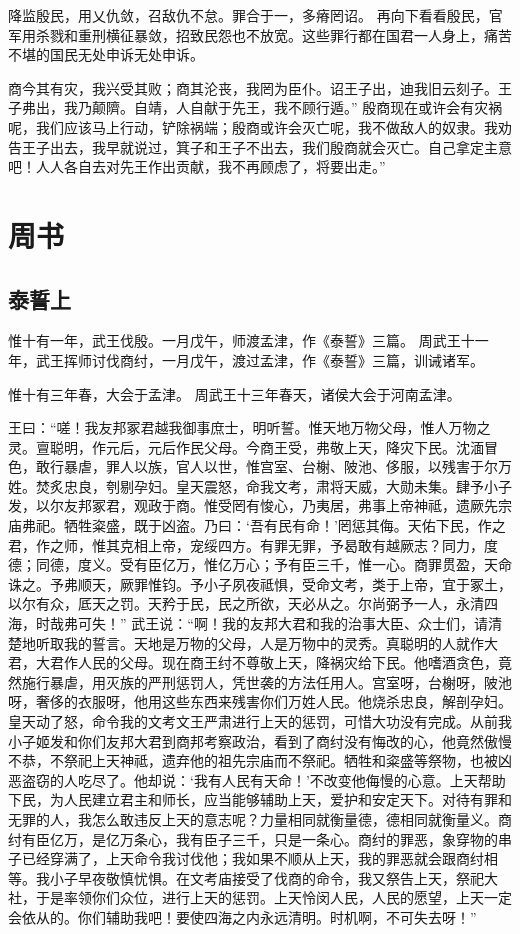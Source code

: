 \documentclass[12pt,UTF8]{ctexbook}
\begin{document}
降监殷民，用乂仇敛，召敌仇不怠。罪合于一，多瘠罔诏。
再向下看看殷民，官军用杀戮和重刑横征暴敛，招致民怨也不放宽。这些罪行都在国君一人身上，痛苦不堪的国民无处申诉无处申诉。

商今其有灾，我兴受其败；商其沦丧，我罔为臣仆。诏王子出，迪我旧云刻子。王子弗出，我乃颠隮。自靖，人自献于先王，我不顾行遁。”
殷商现在或许会有灾祸呢，我们应该马上行动，铲除祸端；殷商或许会灭亡呢，我不做敌人的奴隶。我劝告王子出去，我早就说过，箕子和王子不出去，我们殷商就会灭亡。自己拿定主意吧！人人各自去对先王作出贡献，我不再顾虑了，将要出走。”

\part{周书}

\chapter{泰誓上}

惟十有一年，武王伐殷。一月戊午，师渡孟津，作《泰誓》三篇。
周武王十一年，武王挥师讨伐商纣，一月戊午，渡过孟津，作《泰誓》三篇，训诫诸军。


惟十有三年春，大会于孟津。
周武王十三年春天，诸侯大会于河南孟津。

王曰：“嗟！我友邦冢君越我御事庶士，明听誓。惟天地万物父母，惟人万物之灵。亶聪明，作元后，元后作民父母。今商王受，弗敬上天，降灾下民。沈湎冒色，敢行暴虐，罪人以族，官人以世，惟宫室、台榭、陂池、侈服，以残害于尔万姓。焚炙忠良，刳剔孕妇。皇天震怒，命我文考，肃将天威，大勋未集。肆予小子发，以尔友邦冢君，观政于商。惟受罔有悛心，乃夷居，弗事上帝神祗，遗厥先宗庙弗祀。牺牲粢盛，既于凶盗。乃曰：‘吾有民有命！’罔惩其侮。天佑下民，作之君，作之师，惟其克相上帝，宠绥四方。有罪无罪，予曷敢有越厥志？同力，度德；同德，度义。受有臣亿万，惟亿万心；予有臣三千，惟一心。商罪贯盈，天命诛之。予弗顺天，厥罪惟钧。予小子夙夜祗惧，受命文考，类于上帝，宜于冢土，以尔有众，厎天之罚。天矜于民，民之所欲，天必从之。尔尚弼予一人，永清四海，时哉弗可失！”
武王说：“啊！我的友邦大君和我的治事大臣、众士们，请清楚地听取我的誓言。天地是万物的父母，人是万物中的灵秀。真聪明的人就作大君，大君作人民的父母。现在商王纣不尊敬上天，降祸灾给下民。他嗜酒贪色，竟然施行暴虐，用灭族的严刑惩罚人，凭世袭的方法任用人。宫室呀，台榭呀，陂池呀，奢侈的衣服呀，他用这些东西来残害你们万姓人民。他烧杀忠良，解剖孕妇。皇天动了怒，命令我的文考文王严肃进行上天的惩罚，可惜大功没有完成。从前我小子姬发和你们友邦大君到商邦考察政治，看到了商纣没有悔改的心，他竟然傲慢不恭，不祭祀上天神祗，遗弃他的祖先宗庙而不祭祀。牺牲和粢盛等祭物，也被凶恶盗窃的人吃尽了。他却说：‘我有人民有天命！’不改变他侮慢的心意。上天帮助下民，为人民建立君主和师长，应当能够辅助上天，爱护和安定天下。对待有罪和无罪的人，我怎么敢违反上天的意志呢？力量相同就衡量德，德相同就衡量义。商纣有臣亿万，是亿万条心，我有臣子三千，只是一条心。商纣的罪恶，象穿物的串子已经穿满了，上天命令我讨伐他；我如果不顺从上天，我的罪恶就会跟商纣相等。我小子早夜敬慎忧惧。在文考庙接受了伐商的命令，我又祭告上天，祭祀大社，于是率领你们众位，进行上天的惩罚。上天怜闵人民，人民的愿望，上天一定会依从的。你们辅助我吧！要使四海之内永远清明。时机啊，不可失去呀！”
\end{document}
